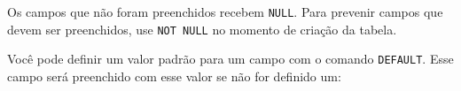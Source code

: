 
Os campos que não foram preenchidos recebem \verb|NULL|. Para prevenir campos que devem ser preenchidos, use \verb|NOT NULL| no momento de criação da tabela.


Você pode definir um valor padrão para um campo com o comando \verb|DEFAULT|. Esse campo será preenchido com esse valor se não for definido um:







